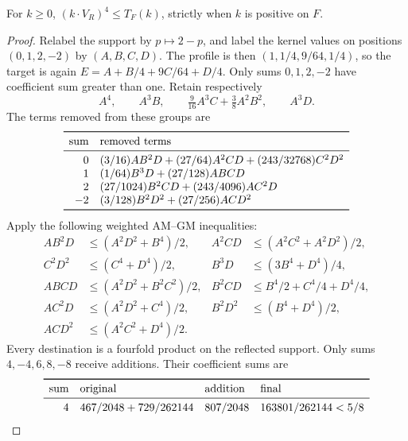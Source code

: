 \begin{lemma}\label{d-VR-comparison}
For $k\geq0$, $(k\cdot V_R)^4\leq T_F(k)$, strictly when $k$ is positive
on $F$.
\end{lemma}

\begin{proof}
Relabel the support by $p\mapsto2-p$, and label the kernel values on positions
$(0,1,2,-2)$ by $(A,B,C,D)$. The profile is then
$(1,1/4,9/64,1/4)$, so the target is again $E=A+B/4+9C/64+D/4$.
Only sums $0,1,2,-2$ have coefficient sum greater than one.
Retain respectively
\begin{equation}\label{d-VR-retained}
A^4,\qquad A^3B,\qquad
\tfrac9{16}A^3C+\tfrac38A^2B^2,\qquad A^3D.
\end{equation}
The terms removed from these groups are
\begin{equation}\label{d-VR-removed}
\begin{array}{r l}
\toprule
\text{sum}&\text{removed terms}\\
\midrule
0&(3/16)AB^2D+(27/64)A^2CD+(243/32768)C^2D^2\\
1&(1/64)B^3D+(27/128)ABCD\\
2&(27/1024)B^2CD+(243/4096)AC^2D\\
-2&(3/128)B^2D^2+(27/256)ACD^2\\
\bottomrule
\end{array}
\end{equation}
Apply the following weighted AM--GM inequalities:
\begin{equation}\label{d-VR-redistribution}
\begin{aligned}
AB^2D&\leq(A^2D^2+B^4)/2,&
A^2CD&\leq(A^2C^2+A^2D^2)/2,\\
C^2D^2&\leq(C^4+D^4)/2,&
B^3D&\leq(3B^4+D^4)/4,\\
ABCD&\leq(A^2D^2+B^2C^2)/2,&
B^2CD&\leq B^4/2+C^4/4+D^4/4,\\
AC^2D&\leq(A^2D^2+C^4)/2,&
B^2D^2&\leq(B^4+D^4)/2,\\
ACD^2&\leq(A^2C^2+D^4)/2.&&
\end{aligned}
\end{equation}
Every destination is a fourfold product on the reflected support. Only
sums $4,-4,6,8,-8$ receive additions. Their coefficient sums are
\begin{equation}\label{d-VR-ledger}
\begin{array}{r l l l}
\toprule
\text{sum}&\text{original}&\text{addition}&\text{final}\\
\midrule
4&467/2048+729/262144&807/2048&163801/262144<5/8\\

\end{array}
\end{equation}
\end{proof}
